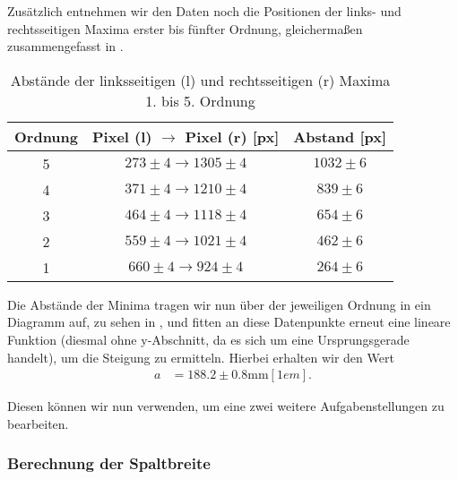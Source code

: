 Zusätzlich entnehmen wir den Daten noch die Positionen der links- und rechtsseitigen Maxima erster bis fünfter Ordnung, gleichermaßen zusammengefasst in .

\begin{table}[H]
  \centering
  \caption{Abstände der linksseitigen (l) und rechtsseitigen (r) Maxima 1. bis 5. Ordnung}
  \vspace*{0.5em}
  \begin{tabular}{c|c|c}
    Ordnung & Pixel (l) $\to$ Pixel (r) [px] & Abstand [px]\\\hline
    5 & $273 \pm 4 \to 1305 \pm 4$ & $1032 \pm 6$\\
    4 & $371 \pm 4 \to 1210 \pm 4$ & $839 \pm 6$\\
    3 & $464 \pm 4 \to 1118 \pm 4$ & $654 \pm 6$\\
    2 & $559 \pm 4 \to 1021 \pm 4$ & $462 \pm 6$\\
    1 & $660 \pm 4 \to 924 \pm 4$ & $264 \pm 6$
  \end{tabular}
\end{table}

Die Abstände der Minima tragen wir nun über der jeweiligen Ordnung in ein Diagramm auf, zu sehen in , und fitten an diese Datenpunkte erneut eine lineare Funktion (diesmal ohne y-Abschnitt, da es sich um eine Ursprungsgerade handelt), um die Steigung zu ermitteln. Hierbei erhalten wir den Wert
\begin{align}
  a &= 188.2 \pm 0.8 \si{\milli\meter}[1em].
\end{align}

Diesen können wir nun verwenden, um eine zwei weitere Aufgabenstellungen zu bearbeiten.

\subsubsection*{Berechnung der Spaltbreite}

